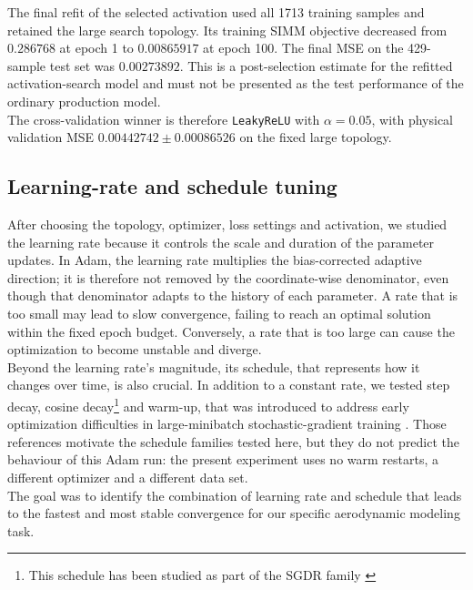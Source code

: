 The final refit of the selected activation used all 1713 training samples and retained the large search topology. Its training SIMM objective decreased from $0.286768$ at epoch 1 to $0.00865917$ at epoch 100. The final MSE on the 429-sample test set was $0.00273892$. This is a post-selection estimate for the refitted activation-search model and must not be presented as the test performance of the ordinary production model.\\

The cross-validation winner is therefore \texttt{LeakyReLU} with $\alpha=0.05$, with physical validation MSE $0.00442742\pm0.00086526$ on the fixed large topology.

\subsection{Learning-rate and schedule tuning}
\label{sec:04_learning_rate_tuning}

After choosing the topology, optimizer, loss settings and activation, we studied the learning rate because it controls the scale and duration of the parameter updates. In Adam, the learning rate multiplies the bias-corrected adaptive direction; it is therefore not removed by the coordinate-wise denominator, even though that denominator adapts to the history of each parameter. A rate that is too small may lead to slow convergence, failing to reach an optimal solution within the fixed epoch budget. Conversely, a rate that is too large can cause the optimization to become unstable and diverge.\\

Beyond the learning rate's magnitude, its schedule, that represents how it changes over time, is also crucial. In addition to a constant rate, we tested step decay, cosine decay\footnote{This schedule has been studied as part of the SGDR family \citep{loshchilov2017sgdr}} and warm-up, that was introduced to address early optimization difficulties in large-minibatch stochastic-gradient training \citep{goyal2017accurate}. Those references motivate the schedule families tested here, but they do not predict the behaviour of this Adam run: the present experiment uses no warm restarts, a different optimizer and a different data set.\\

The goal was to identify the combination of learning rate and schedule that leads to the fastest and most stable convergence for our specific aerodynamic modeling task.\\

